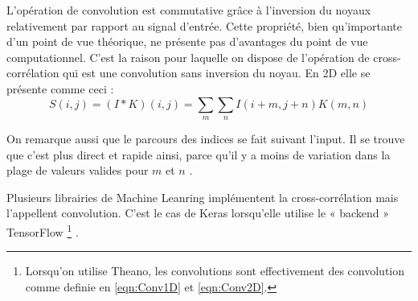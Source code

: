L'opération de convolution est commutative grâce à l'inversion du noyaux relativement par rapport au signal d'entrée. Cette propriété, bien qu'importante d'un point de vue théorique, ne présente pas d'avantages du point de vue computationnel. C'est la raison pour laquelle on dispose de l'opération de cross-corrélation qui est une convolution sans inversion du noyau. En 2D elle se présente comme ceci :
\begin{equation}
 S(i,j) = (I * K)(i,j) = \sum_{m}\sum_{n} I(i+m,j+n)K(m,n)
 \label{eqn:Corr2D}
\end{equation}

On remarque aussi que le parcours des indices se fait suivant l'input. Il se trouve que c'est plus direct et rapide ainsi, parce qu'il y a moins de variation dans la plage de valeurs valides pour $m$ et $n$ \parencite[322ff.]{Reference5}. 

Plusieurs librairies de Machine Leanring implémentent la cross-corrélation mais l'appellent convolution. C'est le cas de Keras lorsqu'elle utilise le « backend » TensorFlow \footnote{Lorsqu'on utilise Theano, les convolutions sont effectivement des convolution comme definie en \ref{eqn:Conv1D} et \ref{eqn:Conv2D}.} \parencite{Reference6}.
% 
% 


